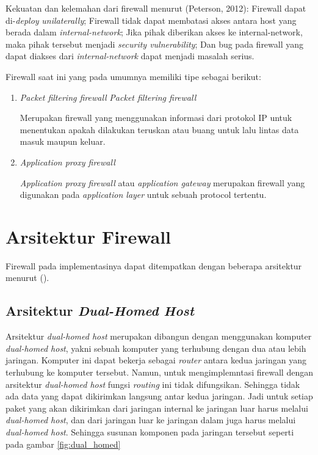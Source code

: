 Kekuatan dan kelemahan dari firewall menurut (Peterson, 2012):
Firewall dapat di-\textit{deploy} \textit{unilaterally};
Firewall tidak dapat membatasi akses antara host yang berada dalam \textit{internal-network};
Jika pihak diberikan akses ke internal-network, maka pihak tersebut menjadi \textit{security vulnerability};
Dan bug pada firewall yang dapat diakses dari \textit{internal-network} dapat menjadi masalah serius.

Firewall saat ini yang pada umumnya memiliki tipe sebagai berikut:

\begin{enumerate}
	\item \textit{Packet filtering firewall}
	\textit{Packet filtering firewall}
	
	Merupakan firewall yang menggunakan informasi dari protokol IP untuk menentukan apakah dilakukan teruskan atau buang untuk lalu lintas data masuk maupun keluar.
	
	\item \textit{Application proxy firewall}
	
	\textit{Application proxy firewall} atau \textit{application gateway} merupakan firewall yang digunakan pada \textit{application layer} untuk sebuah protocol tertentu.
\end{enumerate}

\section{Arsitektur Firewall}
Firewall pada implementasinya dapat ditempatkan dengan beberapa arsitektur menurut (\cite{zwicky2000building}).

\subsection{Arsitektur \textit{Dual-Homed Host}}

Arsitektur \textit{dual-homed host} merupakan dibangun dengan menggunakan komputer \textit{dual-homed host}, yakni sebuah komputer yang terhubung dengan dua atau lebih jaringan. Komputer ini dapat bekerja sebagai \textit{router} antara kedua jaringan yang terhubung ke komputer tersebut. Namun, untuk mengimplemntasi firewall dengan arsitektur \textit{dual-homed host} fungsi \textit{routing} ini tidak difungsikan. Sehingga tidak ada data yang dapat dikirimkan langsung antar kedua jaringan. Jadi untuk setiap paket yang akan dikirimkan dari jaringan internal ke jaringan luar harus melalui \textit{dual-homed host}, dan dari jaringan luar ke jaringan dalam juga harus melalui \textit{dual-homed host}. Sehingga susunan komponen pada jaringan tersebut seperti pada gambar \ref{fig:dual_homed}

